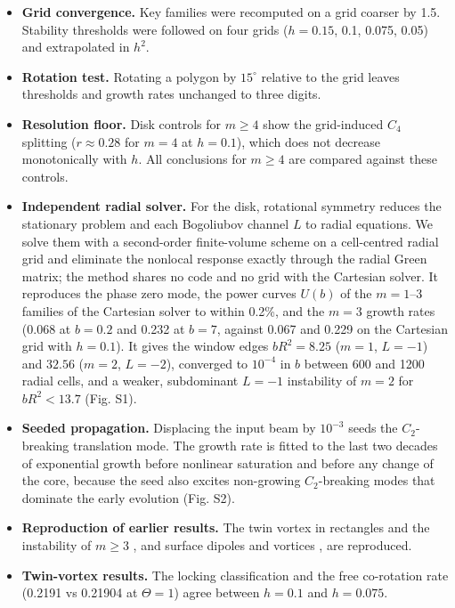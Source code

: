 \begin{itemize}
\tightlist
\item
  \textbf{Grid convergence.} Key families were recomputed on a grid coarser by 1.5. Stability thresholds were followed on four grids (\(h = 0.15\), 0.1, 0.075, 0.05) and extrapolated in \(h^2\).
\item
  \textbf{Rotation test.} Rotating a polygon by \(15^\circ\) relative to the grid leaves thresholds and growth rates unchanged to three digits.
\item
  \textbf{Resolution floor.} Disk controls for \(m \ge 4\) show the grid-induced \(C_4\) splitting (\(r \approx 0.28\) for \(m = 4\) at \(h = 0.1\)), which does not decrease monotonically with \(h\). All conclusions for \(m \ge 4\) are compared against these controls.
\item
  \textbf{Independent radial solver.} For the disk, rotational symmetry reduces the stationary problem and each Bogoliubov channel \(L\) to radial equations. We solve them with a second-order finite-volume scheme on a cell-centred radial grid and eliminate the nonlocal response exactly through the radial Green matrix; the method shares no code and no grid with the Cartesian solver. It reproduces the phase zero mode, the power curves \(U(b)\) of the \(m = 1\)--3 families of the Cartesian solver to within 0.2\%, and the \(m = 3\) growth rates (0.068 at \(b = 0.2\) and 0.232 at \(b = 7\), against 0.067 and 0.229 on the Cartesian grid with \(h = 0.1\)). It gives the window edges \(bR^2 = 8.25\) (\(m = 1\), \(L = -1\)) and \(32.56\) (\(m = 2\), \(L = -2\)), converged to \(10^{-4}\) in \(b\) between 600 and 1200 radial cells, and a weaker, subdominant \(L = -1\) instability of \(m = 2\) for \(bR^2 < 13.7\) (Fig. S1).
\item
  \textbf{Seeded propagation.} Displacing the input beam by \(10^{-3}\) seeds the \(C_2\)-breaking translation mode. The growth rate is fitted to the last two decades of exponential growth before nonlinear saturation and before any change of the core, because the seed also excites non-growing \(C_2\)-breaking modes that dominate the early evolution (Fig. S2).
\item
  \textbf{Reproduction of earlier results.} The twin vortex in rectangles and the instability of \(m \ge 3\) \citep{Ye2010twin}, and surface dipoles and vortices \citep{Ye2008surface}, are reproduced.
\item
  \textbf{Twin-vortex results.} The locking classification and the free co-rotation rate (0.2191 vs 0.21904 at \(\Theta = 1\)) agree between \(h = 0.1\) and \(h = 0.075\).
\end{itemize}

